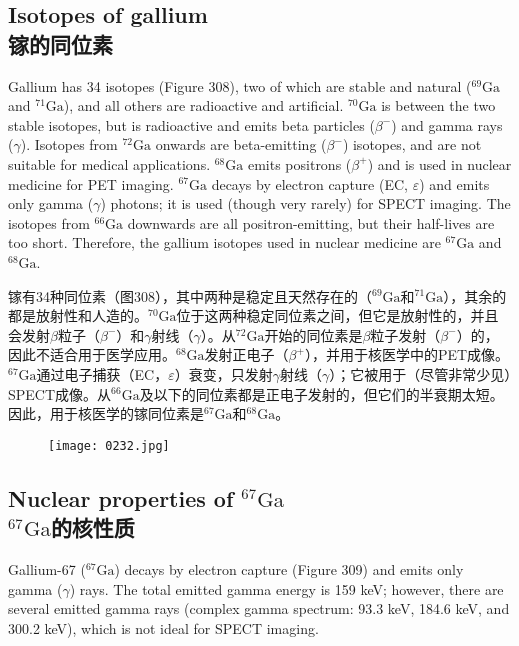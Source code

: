 \documentclass[dvipsnames, svgnames,a4paper,11pt]{article}
\begin{document}
\subsection{Isotopes of gallium\\ 镓的同位素}  
Gallium has 34 isotopes (Figure 308), two of which are stable and natural (\(\mathrm{^{69}Ga}\) and \(\mathrm{^{71}Ga}\)), and all others are radioactive and artificial. \(\mathrm{^{70}Ga}\) is between the two stable isotopes, but is radioactive and emits beta particles (\(\beta^-\)) and gamma rays (\(\gamma\)). Isotopes from \(\mathrm{^{72}Ga}\) onwards are beta-emitting (\(\beta^-\)) isotopes, and are not suitable for medical applications. \(\mathrm{^{68}Ga}\) emits positrons (\(\beta^+\)) and is used in nuclear medicine for PET imaging. \(\mathrm{^{67}Ga}\) decays by electron capture (EC, \(\varepsilon\)) and emits only gamma (\(\gamma\)) photons; it is used (though very rarely) for SPECT imaging. The isotopes from \(\mathrm{^{66}Ga}\) downwards are all positron-emitting, but their half-lives are too short. Therefore, the gallium isotopes used in nuclear medicine are \(\mathrm{^{67}Ga}\) and \(\mathrm{^{68}Ga}\).

镓有34种同位素（图308），其中两种是稳定且天然存在的（\(\mathrm{^{69}Ga}\)和\(\mathrm{^{71}Ga}\)），其余的都是放射性和人造的。\(\mathrm{^{70}Ga}\)位于这两种稳定同位素之间，但它是放射性的，并且会发射\(\beta\)粒子（\(\beta^-\)）和$\gamma$射线（\(\gamma\)）。从\(\mathrm{^{72}Ga}\)开始的同位素是\(\beta\)粒子发射（\(\beta^-\)）的，因此不适合用于医学应用。\(\mathrm{^{68}Ga}\)发射正电子（\(\beta^+\)），并用于核医学中的PET成像。\(\mathrm{^{67}Ga}\)通过电子捕获（EC，\(\varepsilon\)）衰变，只发射$\gamma$射线（\(\gamma\)）；它被用于（尽管非常少见）SPECT成像。从\(\mathrm{^{66}Ga}\)及以下的同位素都是正电子发射的，但它们的半衰期太短。因此，用于核医学的镓同位素是\(\mathrm{^{67}Ga}\)和\(\mathrm{^{68}Ga}\)。

\begin{figure}[h]
	\centering
    \texttt{[image: 0232.jpg]}  
     \label{fig308}
\end{figure}


\subsection{Nuclear properties of \(\mathrm{^{67}Ga}\)\\ \(\mathrm{^{67}Ga}\)的核性质}  
Gallium-67 (\(\mathrm{^{67}Ga}\)) decays by electron capture (Figure 309) and emits only gamma (\(\gamma\)) rays. The total emitted gamma energy is 159 keV; however, there are several emitted gamma rays (complex gamma spectrum: 93.3 keV, 184.6 keV, and 300.2 keV), which is not ideal for SPECT imaging.
\end{document}
